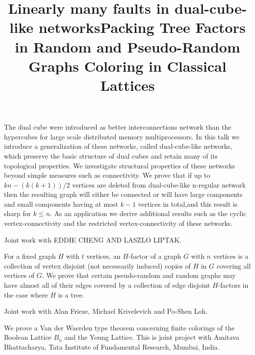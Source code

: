\documentclass{article}
\begin{document}
\vspace{.25in}


\title{Linearly many faults in dual-cube-like networks}
\endtitle
The dual cube were introduced as better interconnections network
than the hypercubes for large scale distributed memory multiprocessors. In
this talk we introduce a generalization of these networks, called
dual-cube-like networks, which preserve the basic structure of dual cubes
and retain many of its topological properties. We investigate structural
properties of these networks beyond simple measures such as connectivity. We
prove that if up to $kn-(k(k+1))/2$ vertices are deleted from dual-cube-like
n-regular network then the resulting graph will either be connected or will
have large components and small components having at most $k-1$ vertices in
total,and this result is sharp for $k\leq n$. As an application we derive
additional results such as the cyclic vertex-connectivity and the restricted
vertex-connectivity of these networks.

Joint work with EDDIE CHENG AND LASZLO LIPTAK.

\vspace{.25in}


\title{Packing Tree Factors in Random and Pseudo-Random Graphs}
\endtitle
For a fixed graph $H$ with $t$ vertices, an $H$-factor of a graph
$G$ with $n$ vertices is a collection of vertex disjoint (not necessarily
induced) copies of $H$ in $G$ covering all vertices of $G$.  We prove that
certain pseudo-random and random graphs may have almost all of their edges
covered by a collection of edge disjoint $H$-factors in the case where $H$
is a tree.

Joint work with Alan Frieze, Michael Krivelevich and Po-Shen Loh. 




\vspace{.25in}

\title{ Coloring in Classical Lattices}
\endtitle
We prove a Van der Waerden type theorem concerning finite colorings of the Boolean Lattice $B_n$ and the Young Lattice.  This is joint project with Amitava Bhattacharya, Tata Institute of Fundamental Research, Mumbai, India.
\end{document}
